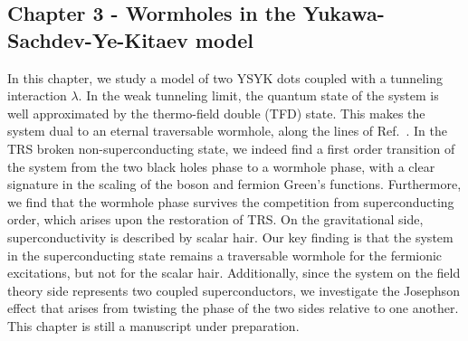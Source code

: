\subsection{Chapter 3 - Wormholes in the Yukawa-Sachdev-Ye-Kitaev model}
In this chapter, we study a model of two YSYK dots coupled with a tunneling interaction $\lambda$. In the weak tunneling limit, the quantum state of the system is well approximated by the thermo-field double (TFD) state. This makes the system dual to an eternal traversable wormhole, along the lines of Ref.~\cite{maldacena2018eternal,maldacena2003eternal}. In the TRS broken non-superconducting state, we indeed find a first order transition of the system from the two black holes phase to a wormhole phase, with a clear signature in the scaling of the boson and fermion Green's functions. Furthermore, we find that the wormhole phase survives the competition from superconducting order, which arises upon the restoration of TRS. On the gravitational side, superconductivity is described by scalar hair. Our key finding is that the system in the superconducting state remains a traversable wormhole for the fermionic excitations, but not for the scalar hair. Additionally, since the system on the field theory side represents two coupled superconductors, we investigate the Josephson effect that arises from twisting the phase of the two sides relative to one another. This chapter is still a manuscript under preparation. 